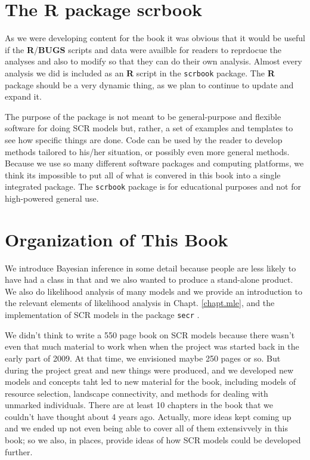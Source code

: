 \section*{The R package scrbook}

As we were developing content for the book it was obvious that it
would be useful if the {\bf R}/{\bf BUGS} scripts and data were availble for
readers to reprdocue the analyses and also to modify so that they can
do their own analysis.  Almost every analysis we did is included as an
{\bf R} script in the \mbox{\tt scrbook} package.
The {\bf R} package should be a very dynamic thing, as we plan to
continue to update and expand it.

The purpose of the package is not meant to be general-purpose and
flexible software for doing SCR models but, rather, a set of examples
and templates to see how specific things are done. Code can be used
by the reader to develop methods tailored to his/her situation, or
possibly even more general methods.  Because we use so many different
software packages and computing platforms, we think its impossible to
put all of what is convered in this book into a single integrated
package.  The \mbox{\tt scrbook} package is for educational purposes
and not for high-powered general use.



















\section*{Organization of This Book}

We introduce Bayesian inference in some detail because people are less
likely to have had a class in that and we also wanted to produce a
stand-alone product.  We also do likelihood analysis of many models
and we provide an introduction to the relevant elements of likelihood
analysis in Chapt. \ref{chapt.mle}, and the implementation of SCR
models in the package \mbox{\tt secr} \citep{efford_etal:2009euring}.

We didn't think to write a 550 page book on SCR models because there
wasn't even that much material to work when when the project was
started back in the early part of 2009. At that time, we envisioned
maybe 250 pages or so. But during the project great and new things
were produced, and we developed new models and concepts taht led to
new material for the book, including models of resource selection,
landscape connectivity, and methods for dealing with unmarked
individuals. There are at least 10 chapters in the book that we
couldn't have thought about 4 years ago. Actually, more ideas kept
coming up and we ended up not even being able to cover all of them
extensivvely in this book; so we also, in places, provide ideas of how
SCR models could be developed further.


